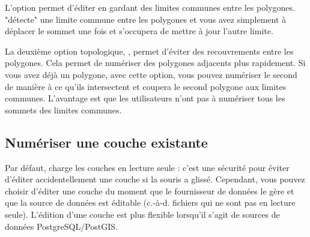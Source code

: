
L'option  permet d'éditer en gardant des limites communes entre les polygones. \qg "détecte" une limite commune entre les polygones et vous avez simplement à déplacer le sommet une fois et \qg s'occupera de mettre à jour l'autre limite.


La deuxième option topologique, , permet d'éviter des recouvrements entre les polygones. Cela permet de numériser des polygones adjacents plus rapidement. Si vous avez déjà un polygone, avec cette option, vous pouvez numériser le second de manière à ce qu'ils intersectent et \qg coupera le second polygone aux limites communes. L'avantage est que les utilisateurs n'ont pas à numériser tous les sommets des limites communes.

\subsection{Numériser une couche existante}
\label{sec:edit_existing_layer}

Par défaut, \qg charge les couches en lecture seule : c'est une sécurité pour éviter d'éditer accidentellement une couche si la souris a glissé. Cependant, vous pouvez choisir d'éditer une couche du moment que le fournisseur de données le gère et que la source de données est éditable (c.-à-d. fichiers qui ne sont pas en lecture seule). 
L'édition d'une couche est plus flexible lorsqu'il s'agit de sources de données PostgreSQL/PostGIS.

